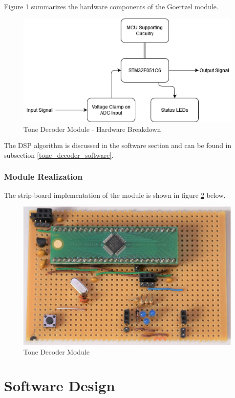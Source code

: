 Figure \ref{fig:goertzel_schematic_block_form} summarizes the hardware components of the Goertzel module.

\begin{figure}[H]
	\centering
	\includegraphics[width=.8\textwidth]{figures/design/goertzel_schematic_block_form.png}
	\caption{Tone Decoder Module - Hardware Breakdown}
	\label{fig:goertzel_schematic_block_form}
\end{figure}

The DSP algorithm is discussed in the software section and can be found in subsection \ref{tone_decoder_software}.

\subsubsection{Module Realization}
The strip-board implementation of the module is shown in figure \ref{fig:module_tone_decoder} below.

\begin{figure}[H]
	\centering
	\includegraphics[width=.6\textwidth]{figures/modules/goertzel_filter.jpg}
	\caption{Tone Decoder Module}
	\label{fig:module_tone_decoder}
\end{figure}





\section{Software Design}


